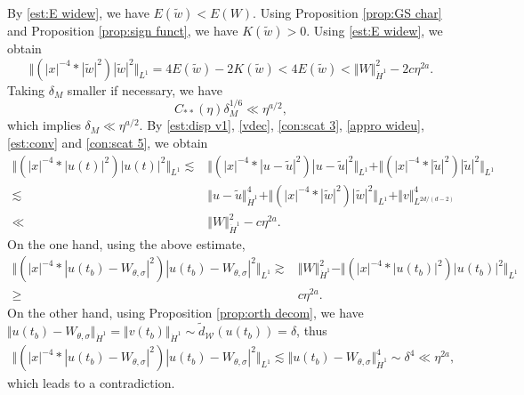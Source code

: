 \documentclass[reqno, 11pt]{amsart}
\numberwithin{equation}{section}
\theoremstyle{plain}
\theoremstyle{definition}
\numberwithin{equation}{section}
\numberwithin{theorem}{section}
\numberwithin{equation}{section}
\numberwithin{equation}{section}
\numberwithin{theorem}{section}
\begin{document}
	By \eqref{est:E widew}, we have $E(\widetilde{w})<E(W)$. Using Proposition \ref{prop:GS char} and Proposition \ref{prop:sign funct}, we have $K(\widetilde{w})>0$. Using \eqref{est:E widew}, we obtain
	\begin{equation}\label{est:conv}
	\Vert{\left(|x|^{-4}*|\widetilde{w}|^2\right)|\widetilde{w}|^2}\Vert_{L^1}=4E(\widetilde{w})-2K(\widetilde{w})<4E(\widetilde{w}) <\Vert W \Vert_{\dot H^1}^{2}-2c\eta^{2a}.
	\end{equation}
	Taking $\delta_{M}$ smaller if necessary, we have 
	\begin{equation}\label{con:scat 5}
	C_{**}(\eta)\delta_{M}^{1/6} \ll \eta^{a/2},
	\end{equation}
	which implies $\delta_{M} \ll \eta^{a/2}$. By \eqref{est:disp v1}, \eqref{vdec}, \eqref{con:scat 3}, \eqref{appro wideu}, \eqref{est:conv} and \eqref{con:scat 5}, we obtain 
	\begin{equation*}
	\begin{aligned}
	\Vert{\left(|x|^{-4}*|u(t)|^2\right)|u(t)|^2}\Vert_{L^1}\lesssim&\Vert{\left(|x|^{-4}*|u-\widetilde{u}|^2\right)|u-\widetilde{u}|^2}\Vert_{L^1}+\Vert{\left(|x|^{-4}*|\widetilde{u}|^2\right)|\widetilde{u}|^2}\Vert_{L^1}\\\lesssim&\Vert u-\widetilde{u}\Vert_{\dot H^1}^4+\Vert{\left(|x|^{-4}*|\widetilde{w}|^2\right)|\widetilde{w}|^2}\Vert_{L^1}+\Vert v \Vert_{L^{2d/(d-2)}}^4\\ \ll& \Vert W \Vert_{\dot H^1}^{2}-c\eta^{2a}.
	\end{aligned}
	\end{equation*}
	On the one hand, using the above estimate, 
	\begin{equation*}
	\begin{aligned}
	\Vert{\left(|x|^{-4}*|u(t_b)-W_{\theta,\sigma}|^2\right)|u(t_b)-W_{\theta,\sigma}|^2}\Vert_{L^1}\gtrsim&\Vert W\Vert_{\dot H^1}^2-\Vert{\left(|x|^{-4}*|u(t_b)|^2\right)|u(t_b)|^2}\Vert_{L^1}\\\geq&c\eta^{2a}.
	\end{aligned}
	\end{equation*}
	On the other hand, using Proposition \ref{prop:orth decom}, we have $\Vert u(t_b)-W_{\theta,\sigma}\Vert_{\dot H^1}=\Vert v(t_b)\Vert_{\dot H^1}\sim\widetilde{d}_{\mathcal{W}}(u(t_b))=\delta $, thus
	\begin{equation*}
	\begin{aligned}
	\Vert{\left(|x|^{-4}*|u(t_b)-W_{\theta,\sigma}|^2\right)|u(t_b)-W_{\theta,\sigma}|^2}\Vert_{L^1}\lesssim \Vert u(t_b)-W_{\theta,\sigma}\Vert_{\dot H^1}^4\sim \delta^4\ll \eta^{2a},
	\end{aligned}
	\end{equation*}
	which leads to a contradiction. 
	
\end{document}
